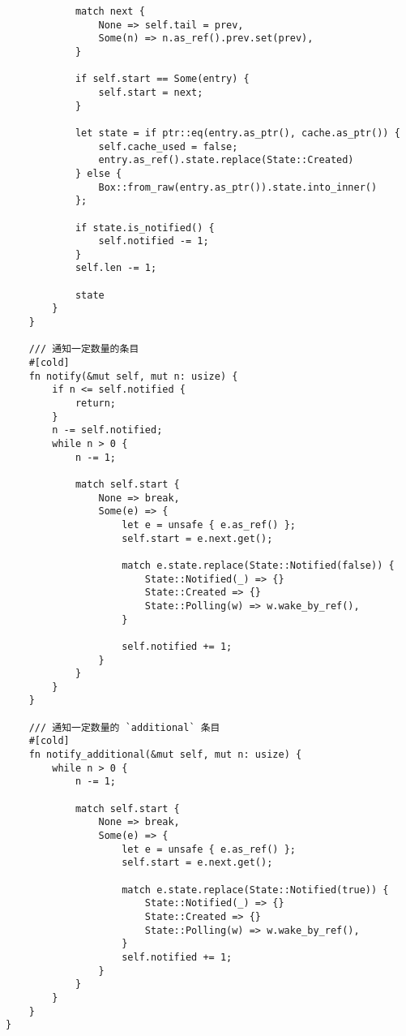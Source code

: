 \begin{lstlisting}
            match next {
                None => self.tail = prev,
                Some(n) => n.as_ref().prev.set(prev),
            }

            if self.start == Some(entry) {
                self.start = next;
            }

            let state = if ptr::eq(entry.as_ptr(), cache.as_ptr()) {
                self.cache_used = false;
                entry.as_ref().state.replace(State::Created)
            } else {
                Box::from_raw(entry.as_ptr()).state.into_inner()
            };

            if state.is_notified() {
                self.notified -= 1;
            }
            self.len -= 1;

            state
        }
    }

    /// 通知一定数量的条目
    #[cold]
    fn notify(&mut self, mut n: usize) {
        if n <= self.notified {
            return;
        }
        n -= self.notified;
        while n > 0 {
            n -= 1;

            match self.start {
                None => break,
                Some(e) => {
                    let e = unsafe { e.as_ref() };
                    self.start = e.next.get();

                    match e.state.replace(State::Notified(false)) {
                        State::Notified(_) => {}
                        State::Created => {}
                        State::Polling(w) => w.wake_by_ref(),
                    }

                    self.notified += 1;
                }
            }
        }
    }

    /// 通知一定数量的 `additional` 条目
    #[cold]
    fn notify_additional(&mut self, mut n: usize) {
        while n > 0 {
            n -= 1;

            match self.start {
                None => break,
                Some(e) => {
                    let e = unsafe { e.as_ref() };
                    self.start = e.next.get();

                    match e.state.replace(State::Notified(true)) {
                        State::Notified(_) => {}
                        State::Created => {}
                        State::Polling(w) => w.wake_by_ref(),
                    }
                    self.notified += 1;
                }
            }
        }
    }
}
\end{lstlisting}